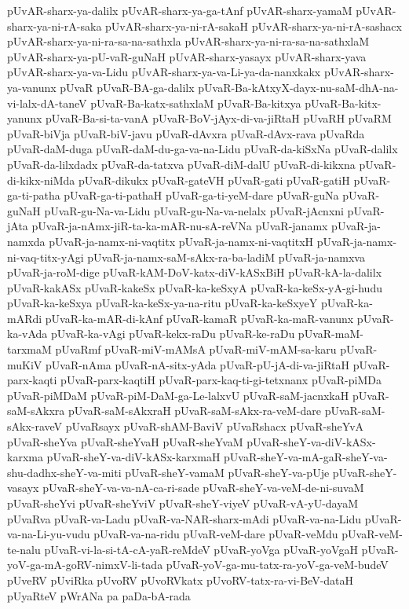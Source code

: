 {pUvAR-sharx-ya-dalilx
pUvAR-sharx-ya-ga-tAnf
pUvAR-sharx-yamaM
pUvAR-sharx-ya-ni-rA-saka
pUvAR-sharx-ya-ni-rA-sakaH
pUvAR-sharx-ya-ni-rA-sashacx
pUvAR-sharx-ya-ni-ra-sa-na-sathxla
pUvAR-sharx-ya-ni-ra-sa-na-sathxlaM
pUvAR-sharx-ya-pU-vaR-guNaH
pUvAR-sharx-yasayx
pUvAR-sharx-yava
pUvAR-sharx-ya-va-Lidu
pUvAR-sharx-ya-va-Li-ya-da-nanxkakx
pUvAR-sharx-ya-vanunx
pUvaR
pUvaR-BA-ga-dalilx
pUvaR-Ba-kAtxyX-dayx-nu-saM-dhA-na-vi-lalx-dA-taneV
pUvaR-Ba-katx-sathxlaM
pUvaR-Ba-kitxya
pUvaR-Ba-kitx-yanunx
pUvaR-Ba-si-ta-vanA
pUvaR-BoV-jAyx-di-va-jiRtaH
pUvaRH
pUvaRM
pUvaR-biVja
pUvaR-biV-javu
pUvaR-dAvxra
pUvaR-dAvx-rava
pUvaRda
pUvaR-daM-duga
pUvaR-daM-du-ga-va-na-Lidu
pUvaR-da-kiSxNa
pUvaR-dalilx
pUvaR-da-lilxdadx
pUvaR-da-tatxva
pUvaR-diM-dalU
pUvaR-di-kikxna
pUvaR-di-kikx-niMda
pUvaR-dikukx
pUvaR-gateVH
pUvaR-gati
pUvaR-gatiH
pUvaR-ga-ti-patha
pUvaR-ga-ti-pathaH
pUvaR-ga-ti-yeM-dare
pUvaR-guNa
pUvaR-guNaH
pUvaR-gu-Na-va-Lidu
pUvaR-gu-Na-va-nelalx
pUvaR-jAcnxni
pUvaR-jAta
pUvaR-ja-nAmx-jiR-ta-ka-mAR-nu-sA-reVNa
pUvaR-janamx
pUvaR-ja-namxda
pUvaR-ja-namx-ni-vaqtitx
pUvaR-ja-namx-ni-vaqtitxH
pUvaR-ja-namx-ni-vaq-titx-yAgi
pUvaR-ja-namx-saM-sAkx-ra-ba-ladiM
pUvaR-ja-namxva
pUvaR-ja-roM-dige
pUvaR-kAM-DoV-katx-diV-kASxBiH
pUvaR-kA-la-dalilx
pUvaR-kakASx
pUvaR-kakeSx
pUvaR-ka-keSxyA
pUvaR-ka-keSx-yA-gi-hudu
pUvaR-ka-keSxya
pUvaR-ka-keSx-ya-na-ritu
pUvaR-ka-keSxyeY
pUvaR-ka-mARdi
pUvaR-ka-mAR-di-kAnf
pUvaR-kamaR
pUvaR-ka-maR-vanunx
pUvaR-ka-vAda
pUvaR-ka-vAgi
pUvaR-kekx-raDu
pUvaR-ke-raDu
pUvaR-maM-tarxmaM
pUvaRmf
pUvaR-miV-mAMsA
pUvaR-miV-mAM-sa-karu
pUvaR-muKiV
pUvaR-nAma
pUvaR-nA-sitx-yAda
pUvaR-pU-jA-di-va-jiRtaH
pUvaR-parx-kaqti
pUvaR-parx-kaqtiH
pUvaR-parx-kaq-ti-gi-tetxnanx
pUvaR-piMDa
pUvaR-piMDaM
pUvaR-piM-DaM-ga-Le-lalxvU
pUvaR-saM-jacnxkaH
pUvaR-saM-sAkxra
pUvaR-saM-sAkxraH
pUvaR-saM-sAkx-ra-veM-dare
pUvaR-saM-sAkx-raveV
pUvaRsayx
pUvaR-shAM-BaviV
pUvaRshacx
pUvaR-sheYvA
pUvaR-sheYva
pUvaR-sheYvaH
pUvaR-sheYvaM
pUvaR-sheY-va-diV-kASx-karxma
pUvaR-sheY-va-diV-kASx-karxmaH
pUvaR-sheY-va-mA-gaR-sheY-va-shu-dadhx-sheY-va-miti
pUvaR-sheY-vamaM
pUvaR-sheY-va-pUje
pUvaR-sheY-vasayx
pUvaR-sheY-va-va-nA-ca-ri-sade
pUvaR-sheY-va-veM-de-ni-suvaM
pUvaR-sheYvi
pUvaR-sheYviV
pUvaR-sheY-viyeV
pUvaR-vA-yU-dayaM
pUvaRva
pUvaR-va-Ladu
pUvaR-va-NAR-sharx-mAdi
pUvaR-va-na-Lidu
pUvaR-va-na-Li-yu-vudu
pUvaR-va-na-ridu
pUvaR-veM-dare
pUvaR-veMdu
pUvaR-veM-te-nalu
pUvaR-vi-la-si-tA-cA-yaR-reMdeV
pUvaR-yoVga
pUvaR-yoVgaH
pUvaR-yoV-ga-mA-goRV-nimxV-li-tada
pUvaR-yoV-ga-mu-tatx-ra-yoV-ga-veM-budeV
pUveRV
pUviRka
pUvoRV
pUvoRVkatx
pUvoRV-tatx-ra-vi-BeV-dataH
pUyaRteV
pWrANa
pa
paDa-bA-rada
}
